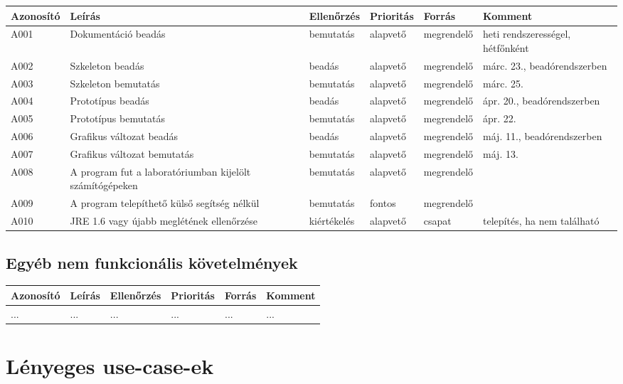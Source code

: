 \begin{longtable}{| p{1.75cm} | p{3cm} | p{1.75cm} | p{1.5cm} | p{1.8cm} | p{2cm} |}
\hline
\textbf{Azonosító}   & \textbf{Leírás} & \textbf{Ellenőrzés} & \textbf{Prioritás} & \textbf{Forrás} & \textbf{Komment} \tabularnewline
\hline\hline
\endhead
A001 & Dokumentáció beadás & bemutatás & alapvető & megrendelő & heti rendszerességel, hétfőnként \tabularnewline \hline
A002 & Szkeleton beadás & beadás & alapvető & megrendelő & márc. 23., beadórendszerben \tabularnewline \hline
A003 & Szkeleton bemutatás & bemutatás & alapvető & megrendelő & márc. 25. \tabularnewline \hline
A004 & Prototípus beadás & beadás & alapvető & megrendelő & ápr. 20., beadórendszerben \tabularnewline \hline
A005 & Prototípus bemutatás & bemutatás & alapvető & megrendelő & ápr. 22.  \tabularnewline \hline
A006 & Grafikus változat beadás & beadás & alapvető & megrendelő & máj. 11., beadórendszerben  \tabularnewline \hline
A007 & Grafikus változat bemutatás & bemutatás & alapvető & megrendelő & máj. 13. \tabularnewline \hline
A008 & A program fut a laboratóriumban kijelölt számítógépeken & bemutatás & alapvető & megrendelő & \tabularnewline \hline
A009 & A program telepíthető külső segítség nélkül & bemutatás & fontos & megrendelő & \tabularnewline \hline
A010 & JRE 1.6 vagy újabb meglétének ellenőrzése & kiértékelés & alapvető & csapat & telepítés, ha nem található \tabularnewline \hline
\end{longtable}

\subsection{Egyéb nem funkcionális követelmények}

\begin{longtable}{| l | l | l | l | l | l |}
\hline
\textbf{Azonosító}   & \textbf{Leírás} & \textbf{Ellenőrzés} & \textbf{Prioritás} & \textbf{Forrás} & \textbf{Komment} \tabularnewline
\hline\hline
... & ... & ... & ... & ... & ... \tabularnewline
\hline
\end{longtable}


\section{Lényeges use-case-ek}
